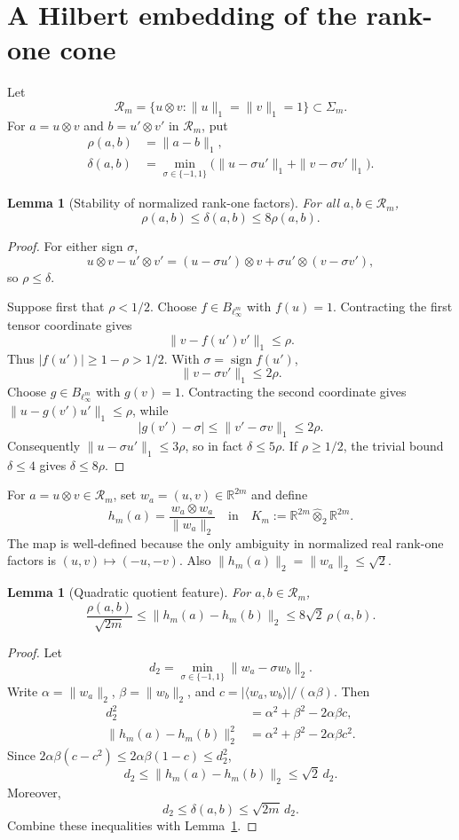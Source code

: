 \documentclass[11pt]{article}
\newtheorem{lemma}[theorem]{Lemma}
\newcommand{\R}{\mathbb R}
\newcommand{\Sig}{\Sigma}
\begin{document}
\section{A Hilbert embedding of the rank-one cone}

Let
\[
 \mathcal R_m=\{u\otimes v:\|u\|_1=\|v\|_1=1\}\subset\Sig_m.
\]
For $a=u\otimes v$ and $b=u'\otimes v'$ in $\mathcal R_m$, put
\begin{align*}
 \rho(a,b)&=\|a-b\|_1,\\
 \delta(a,b)&=\min_{\sigma\in\{-1,1\}}
 \bigl(\|u-\sigma u'\|_1+\|v-\sigma v'\|_1\bigr).
\end{align*}

\begin{lemma}[Stability of normalized rank-one factors]\label{lem:direction}
For all $a,b\in\mathcal R_m$,
\[
 \rho(a,b)\leq\delta(a,b)\leq 8\rho(a,b).
\]
\end{lemma}

\begin{proof}
For either sign $\sigma$,
\[
 u\otimes v-u'\otimes v'
 =(u-\sigma u')\otimes v+\sigma u'\otimes(v-\sigma v'),
\]
so $\rho\leq\delta$.

Suppose first that $\rho<1/2$.  Choose $f\in B_{\ell_\infty^m}$ with
$f(u)=1$.  Contracting the first tensor coordinate gives
\[
 \|v-f(u')v'\|_1\leq\rho.
\]
Thus $|f(u')|\geq1-\rho>1/2$.  With
$\sigma=\operatorname{sign}f(u')$,
\[
 \|v-\sigma v'\|_1\leq2\rho.
\]
Choose $g\in B_{\ell_\infty^m}$ with $g(v)=1$.  Contracting the second
coordinate gives $\|u-g(v')u'\|_1\leq\rho$, while
\[
 |g(v')-\sigma|
 \leq\|v'-\sigma v\|_1\leq2\rho.
\]
Consequently $\|u-\sigma u'\|_1\leq3\rho$, so in fact
$\delta\leq5\rho$.  If $\rho\geq1/2$, the trivial bound
$\delta\leq4$ gives $\delta\leq8\rho$.
\end{proof}

For $a=u\otimes v\in\mathcal R_m$, set $w_a=(u,v)\in\R^{2m}$ and define
\[
 h_m(a)=\frac{w_a\otimes w_a}{\|w_a\|_2}
 \quad\text{in}\quad
 K_m:=\R^{2m}\widehat\otimes_2\R^{2m}.
\]
The map is well-defined because the only ambiguity in normalized real
rank-one factors is $(u,v)\mapsto(-u,-v)$.  Also
$\|h_m(a)\|_2=\|w_a\|_2\leq\sqrt2$.

\begin{lemma}[Quadratic quotient feature]\label{lem:quadratic}
For $a,b\in\mathcal R_m$,
\[
 \frac{\rho(a,b)}{\sqrt{2m}}
 \leq \|h_m(a)-h_m(b)\|_2
 \leq 8\sqrt2\,\rho(a,b).
\]
\end{lemma}

\begin{proof}
Let
\[
 d_2=\min_{\sigma\in\{-1,1\}}\|w_a-\sigma w_b\|_2.
\]
Write $\alpha=\|w_a\|_2$, $\beta=\|w_b\|_2$, and
$c=|\langle w_a,w_b\rangle|/(\alpha\beta)$.  Then
\begin{align*}
 d_2^2&=\alpha^2+\beta^2-2\alpha\beta c,\\
 \|h_m(a)-h_m(b)\|_2^2
 &=\alpha^2+\beta^2-2\alpha\beta c^2.
\end{align*}
Since
$2\alpha\beta(c-c^2)\leq2\alpha\beta(1-c)\leq d_2^2$,
\[
 d_2\leq\|h_m(a)-h_m(b)\|_2\leq\sqrt2\,d_2.
\]
Moreover,
\[
 d_2\leq\delta(a,b)\leq\sqrt{2m}\,d_2.
\]
Combine these inequalities with Lemma~\ref{lem:direction}.
\end{proof}
\end{document}
